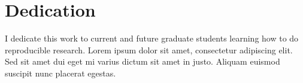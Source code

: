 \section*{Dedication}

\normalsize
I dedicate this work to current and future graduate students learning how to do reproducible research. Lorem ipsum dolor sit amet, consectetur adipiscing elit. Sed sit amet dui eget mi varius dictum sit amet in justo. Aliquam euismod suscipit nunc placerat egestas. 

\newpage
